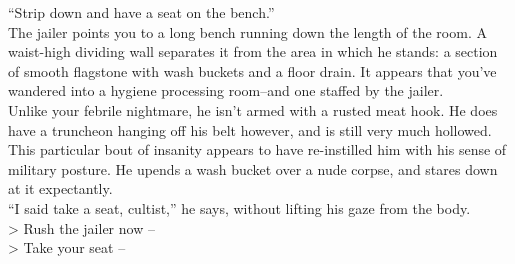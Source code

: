 “Strip down and have a seat on the bench.”\\

The jailer points you to a long bench running down the length of the room. A waist-high dividing wall separates it from the area in which he stands: a section of smooth flagstone with wash buckets and a floor drain. It appears that you’ve wandered into a hygiene processing room--and one staffed by the jailer.\\

Unlike your febrile nightmare, he isn’t armed with a rusted meat hook. He does have a truncheon hanging off his belt however, and is still very much hollowed. This particular bout of insanity appears to have re-instilled him with his sense of military posture. He upends a wash bucket over a nude corpse, and stares down at it expectantly.\\

“I said take a seat, cultist,” he says, without lifting his gaze from the body.\\

> Rush the jailer now -- \\
> Take your seat -- 